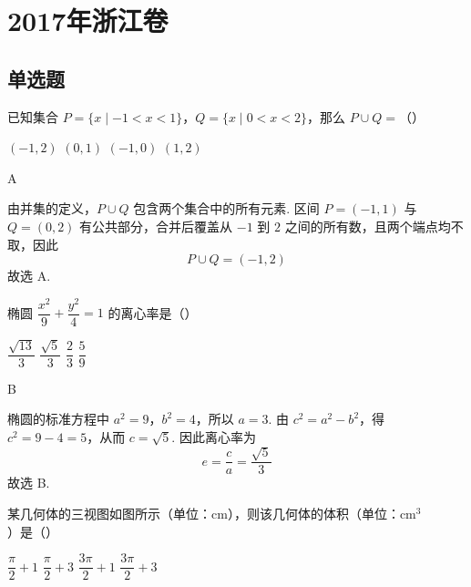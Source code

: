 
\chapter{2017年浙江卷}

\section{单选题}

\begin{problem}
已知集合 \(P=\{x\mid -1<x<1\}\)，\(Q=\{x\mid 0<x<2\}\)，那么 \(P\cup Q=\)（\quad）

\choices
    {\(\left(-1,2\right)\)}
    {\(\left(0,1\right)\)}
    {\(\left(-1,0\right)\)}
    {\(\left(1,2\right)\)}
\end{problem}

\begin{answer}
A
\end{answer}

\begin{solution}
由并集的定义，\(P\cup Q\) 包含两个集合中的所有元素. 区间 \(P=(-1,1)\) 与 \(Q=(0,2)\) 有公共部分，合并后覆盖从 \(-1\) 到 \(2\) 之间的所有数，且两个端点均不取，因此
\[
P\cup Q=(-1,2)
\]
故选 A.
\end{solution}

\begin{problem}
椭圆 \(\dfrac{x^{2}}{9}+\dfrac{y^{2}}{4}=1\) 的离心率是（\quad）

\choices
    {\(\dfrac{\sqrt{13}}{3}\)}
    {\(\dfrac{\sqrt5}{3}\)}
    {\(\dfrac23\)}
    {\(\dfrac59\)}
\end{problem}

\begin{answer}
B
\end{answer}

\begin{solution}
椭圆的标准方程中 \(a^2=9\)，\(b^2=4\)，所以 \(a=3\). 由 \(c^2=a^2-b^2\)，得 \(c^2=9-4=5\)，从而 \(c=\sqrt{5}\). 因此离心率为
\[
e=\frac{c}{a}=\frac{\sqrt{5}}{3}
\]
故选 B.
\end{solution}

\begin{problem}
某几何体的三视图如图所示（单位：\(\mathrm{cm}\)），则该几何体的体积（单位：\(\mathrm{cm}^3\)）是（\quad）

\begin{center}
\end{center}

\choices
    {\(\dfrac{\pi}{2}+1\)}
    {\(\dfrac{\pi}{2}+3\)}
    {\(\dfrac{3\pi}{2}+1\)}
    {\(\dfrac{3\pi}{2}+3\)}
\end{problem}

